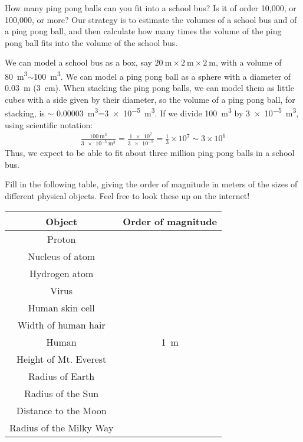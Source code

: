 \begin{example}{How many ping pong balls can you fit into a school bus? Is it of order 10,000, or 100,000, or more?}
Our strategy is to estimate the volumes of a school bus and of a ping pong ball, and then calculate how many times the volume of the ping pong ball fits into the volume of the school bus.

We can model a school bus as a box, say $\SI{20}{\meter}\times \SI{2}{\meter}\times\SI{2}{\meter}$, with a volume of \SI{80}{\meter\cubed}$\sim$\SI{100}{\meter\cubed}. We can model a ping pong ball as a sphere with a diameter of \SI{0.03}{\meter} (\SI{3}{\centi\meter}). When stacking the ping pong balls, we can model them as little cubes with a side given by their diameter, so the volume of a ping pong ball, for stacking, is $\sim$ \SI{0.00003}{\meter\cubed}=\SI{3e-5}{\meter\cubed}. If we divide \SI{100}{\meter\cubed} by \SI{3e-5}{\meter\cubed}, using scientific notation:
\begin{align*}
\frac{\SI{100}{\meter\cubed}}{\SI{3e-5}{\meter\cubed}}=\frac{\num{1e2}}{\num{3e-5}}=\frac{1}{3}\times 10^7\sim 3\times 10^6
\end{align*}
Thus, we expect to be able to fit about three million ping pong balls in a school bus. 
\end{example}


\begin{checkpointSA}{Fill in the following table, giving the order of magnitude in meters of the sizes of different physical objects. Feel free to look these up on the internet!}
\begin{center}
\begin{tabular}{|c|c|}
\hline  
\textbf{Object}&\textbf{Order of magnitude}\\
\hline
Proton&\\ \hline
Nucleus of atom&\\ \hline
Hydrogen atom&\\ \hline
Virus&\\ \hline
Human skin cell&\\ \hline
Width of human hair&\\ \hline
Human &\SI{1}{\meter}\\ \hline
Height of Mt. Everest&\\ \hline
Radius of Earth&\\ \hline
Radius of the Sun&\\ \hline
Distance to the Moon&\\ \hline
Radius of the Milky Way&\\ \hline
\end{tabular}
\end{center}
\end{checkpointSA}


